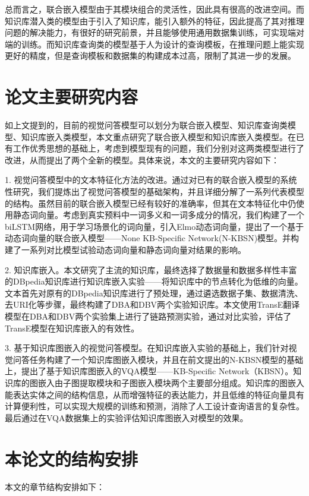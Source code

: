 总而言之，联合嵌入模型由于其模块组合的灵活性，因此具有很高的改进空间。而知识库潜入类的模型由于引入了知识库，能引入额外的特征，因此提高了其对推理问题的解决能力，有很好的研究前景，并且能够使用通用数据集训练，可实现端对端的训练。而知识库查询类的模型基于人为设计的查询模板，在推理问题上能实现更好的精度，但是查询模板和数据集的构建成本过高，限制了其进一步的发展。

\section{论文主要研究内容}

如上文提到的，目前的视觉问答模型可以划分为联合嵌入模型、知识库查询类模型、知识库嵌入类模型，本文重点研究了联合嵌入模型和知识库嵌入类模型。在已有工作优秀思想的基础上，考虑到模型现有的问题，我们分别对这两类模型进行了改进，从而提出了两个全新的模型。具体来说，本文的主要研究内容如下：

1. 视觉问答模型中的文本特征化方法的改进。通过对已有的联合嵌入模型的系统性研究，我们提炼出了视觉问答模型的基础架构，并且详细分解了一系列代表模型的结构。虽然目前的联合嵌入模型已经有较好的准确率，但其在文本特征化中仍使用静态词向量。考虑到真实预料中一词多义和一词多成分的情况，我们构建了一个biLSTM网络，用于学习场景化的词向量，引入Elmo动态词向量，提出了一个基于动态词向量的联合嵌入模型——None KB-Specific Network(N-KBSN)模型。并构建了一系列对比模型试验动态词向量和静态词向量对结果的影响。

2. 知识库嵌入。本文研究了主流的知识库，最终选择了数据量和数据多样性丰富的DBpedia知识库进行知识库嵌入实验——将知识库中的节点转化为低维的向量。文本首先对原有的DBpedia知识库进行了预处理，通过遴选数据子集、数据清洗、去URI化等步骤，最终构建了DBA和DBV两个实验知识库。本文使用TransE翻译模型在DBA和DBV两个实验集上进行了链路预测实验，通过对比实验，评估了TransE模型在知识库嵌入的有效性。

3. 基于知识库图嵌入的视觉问答模型。在知识库嵌入实验的基础上，我们针对视觉问答任务构建了一个知识库图嵌入模块，并且在前文提出的N-KBSN模型的基础上，提出了基于知识库图嵌入的VQA模型——KB-Specific Network（KBSN）。知识库的图嵌入由子图提取模块和子图嵌入模块两个主要部分组成。知识库的图嵌入能表达实体之间的结构信息，从而增强特征的表达能力，并且低维的特征向量具有计算便利性，可以实现大规模的训练和预测，消除了人工设计查询语言的复杂性。最后通过在VQA数据集上的实验评估知识库图嵌入对模型的效果。

\section{本论文的结构安排}
本文的章节结构安排如下：

